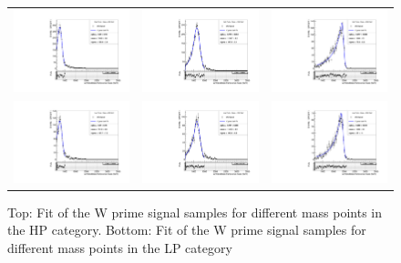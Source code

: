 \begin{figure}[!ht]
\caption{ Top: Fit of the W prime signal samples for different mass points in the HP category. Bottom: Fit of the W prime signal samples for different mass points in the LP category}
\begin{tabular}{ccc}
  \includegraphics[width=150pt]{figuresARC/fits/WprimeHP800.pdf} &
  \includegraphics[width=150pt]{figuresARC/fits/WprimeHP1200.pdf} & 
  \includegraphics[width=150pt]{figuresARC/fits/WprimeHP2000.pdf}\\
    \includegraphics[width=150pt]{figuresARC/fits/WprimeLP800.pdf} &
    \includegraphics[width=150pt]{figuresARC/fits/WprimeLP1200.pdf} &
    \includegraphics[width=150pt]{figuresARC/fits/WprimeLP2000.pdf}\\
\end{tabular}
\label{fig:fits7}
\end{figure}


